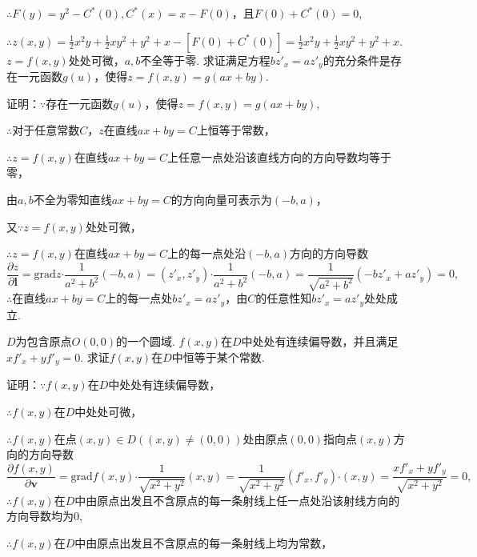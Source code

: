 \documentclass[12pt,UTF8]{ctexart}
\begin{document}
\begin{enumerate}
$\therefore F(y)=y^2-C^*(0),C^*(x)=x-F(0)$，且$F(0)+C^*(0)=0$,

$\therefore z(x,y)=\frac12x^2y+\frac12xy^2+y^2+x-[F(0)+C^*(0)]=\frac12x^2y+\frac12xy^2+y^2+x$.
$z=f(x,y)$处处可微，$a,b$不全等于零. 求证满足方程$bz'_x=az'_y$的充分条件是存在一元函数$g(u)$，使得$z=f(x,y)=g(ax+by)$.

证明：$\because$存在一元函数$g(u)$，使得$z=f(x,y)=g(ax+by)$,

$\therefore$对于任意常数$C$，$z$在直线$ax+by=C$上恒等于常数，

$\therefore z=f(x,y)$在直线$ax+by=C$上任意一点处沿该直线方向的方向导数均等于零，\footnotemark{}

由$a,b$不全为零知直线$ax+by=C$的方向向量可表示为$(-b,a)$，\footnotemark{}

又$\because z=f(x,y)$处处可微，\footnotemark{}

$\therefore z=f(x,y)$在直线$ax+by=C$上的每一点处沿$(-b,a)$方向的方向导数\footnotemark{}
\[\frac{\partial z}{\partial\bm l}=\mathrm{grad}z\bm\cdot\frac1{a^2+b^2}(-b,a)=(z'_x,z'_y)\bm\cdot\frac1{a^2+b^2}(-b,a)=\frac1{\sqrt{a^2+b^2}}(-bz'_x+az'_y)=0,\]
$\therefore$在直线$ax+by=C$上的每一点处$bz'_x=az'_y$，由$C$的任意性知$bz'_x=az'_y$处处成立.\footnotemark{}

$D$为包含原点$O(0,0)$的一个圆域. $f(x,y)$在$D$中处处有连续偏导数，并且满足$xf'_x+yf'_y=0$. 求证$f(x,y)$在$D$中恒等于某个常数.

证明：$\because f(x,y)$在$D$中处处有连续偏导数，

$\therefore f(x,y)$在$D$中处处可微，

$\therefore f(x,y)$在点$(x,y)\in D((x,y)\neq(0,0))$处由原点$(0,0)$指向点$(x,y)$方向的方向导数\footnotemark{}
\[\frac{\partial f(x,y)}{\partial\bm v}=\mathrm{grad}f(x,y)\bm\cdot\frac1{\sqrt{x^2+y^2}}(x,y)=\frac1{\sqrt{x^2+y^2}}(f'_x,f'_y)\bm\cdot(x,y)=\frac{xf'_x+yf'_y}{\sqrt{x^2+y^2}}=0,\]
$\therefore f(x,y)$在$D$中由原点出发且不含原点的每一条射线上任一点处沿该射线方向的方向导数均为$0$,\footnotemark{}

$\therefore f(x,y)$在$D$中由原点出发且不含原点的每一条射线上均为常数，\footnotemark{}


\end{enumerate}
\end{document}
